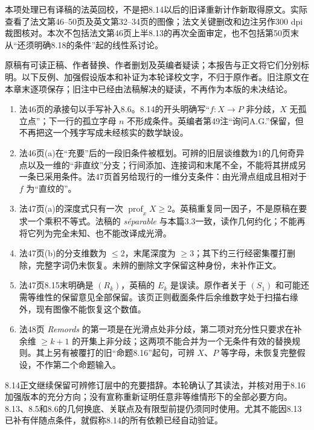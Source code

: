 \begingroup
\def\PD{P^\vee}
\def\depth{\operatorname{depth}}
\def\codim{\operatorname{codim}}

本项处理已有译稿的法英回校，不是把8.14以后的旧译重新计作新取得原文。实际查看了法文第46--50页及英文第32--34页的图像；法文关键删改和边注另作300 dpi裁图核对。本次不包括法文第46页上半8.13的再次全面审定，也不包括第50页末从“还须明确8.18的条件”起的线性系讨论。

原稿有可读正稿、作者替换、作者删划及英编者疑读；本报告与正文将它们分别标明。以下反例、加强假设版本和补证为本轮译校文字，不归于原作者。旧注原文在本章末逐项保存；旧注中已经由法稿解决的疑读，不再作为本版的未决结论。

\begin{enumerate}
\item 法46页的承接句以手写补入8.6。8.14的开头明确写“$f:X\to P$ 非分歧，$X$ 无孤立点”；下一行的孤立字母 $n$ 不形成条件。英编者第49注“询问A.G.”保留，但不再把这一个残字写成未经核实的数学缺设。
\item 法46页(a)在“充要”后的一段旧条件被框划。可辨的旧层谈维数为1的几何奇异点以及一维的“非直纹”分支；行间添加、连接词和末尾不全，不能将其拼成另一条已采用条件。法47页首另给现行的一维分支条件：由光滑点组成且相对于 $f$ 为“直纹的”。
\item 法47页(a)的深度式只有一次 $\operatorname{prof}_xX\ge2$。英稿重复同一因子，不是原稿在要求一个乘积不等式。法稿的 \emph{séparable} 与本篇3.3一致，读作几何约化；不能再将它列为完全未知、也不能改译成光滑。
\item 法47页(b)的分支维数为 $\le2$，末尾深度为 $\ge3$；其下约三行经密集覆打删除，完整字词仍未恢复。未辨的删除文字保留这种身份，未补作正文。
\item 法47页8.15末明确是 $(R_k)$，英稿的 $E_k$ 是误读。原作者关于 $(S_1)$ 和可能还需等维性的保留意见全部保留。该页正则截面条件后余维数字处于扫描右缘外，现有图像不能恢复这个数值。
\item 法48页 \emph{Remords} 的第一项是在光滑点处非分歧，第二项对充分性只要求在补余维 $\ge k+1$ 的开集上非分歧；这两项不能合并为一个无条件有效的替换规则。其上另有被覆打的旧“命题8.16”起句，可辨 $X$、$P$ 等字母，未恢复完整假设，不作第二个命题输入。
\end{enumerate}

8.14正文继续保留可辨修订层中的充要措辞。本轮确认了其读法，并核对用于8.16加强版本的充分方向；没有宣称重新证明任意非等维情形下的全部必要方向。8.13、8.5和8.6的几何换底、关联点及有限型前提仍须同时使用。尤其不能因8.13已补有伴随点条件，就假称8.14的所有依赖已经自动验证。

